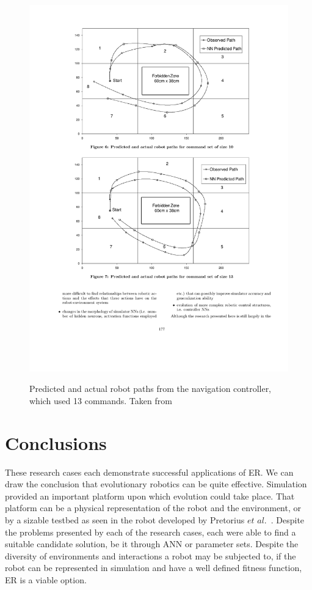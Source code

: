\documentclass{sig-alternate}
\begin{document}
\begin{figure}%
\center
\caption{Predicted and actual robot paths from the navigation controller, which used 13 commands. Taken from ~\cite{Pretorius:2009:TAN:1632149.1632171}}

  \includegraphics[scale=.7]{cr3}
\label{fig:position tracking grid}
\end{figure}
	  
\section{Conclusions}\label{conclusion}

 These research cases each demonstrate successful applications of ER. We can draw the conclusion that evolutionary robotics can be quite effective. Simulation provided an important platform upon which evolution could take place. That platform can be a physical representation of the robot and the environment, or by a sizable testbed as seen in the robot developed by Pretorius $et$ $al.$~\cite{Pretorius:2009:TAN:1632149.1632171}. Despite the problems presented by each of the research cases, each were able to find a suitable candidate solution, be it through ANN or parameter sets. Despite the diversity of environments and interactions a robot may be subjected to, if the robot can be represented in simulation and have a well defined fitness function, ER is a viable option.
\end{document}
